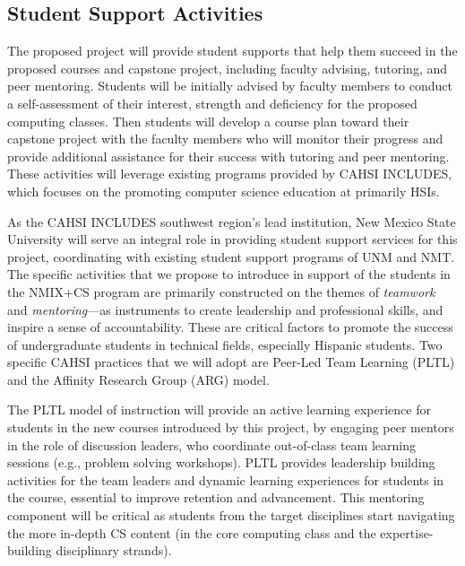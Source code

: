 \subsection{Student Support Activities}
\label{sec:framework:support}

The proposed project will provide student supports that help them succeed in the proposed courses and capstone project, including faculty advising, tutoring, and peer mentoring. Students will be initially advised by faculty members to conduct a self-assessment of their interest, strength and deficiency for the proposed computing classes. Then students will develop a course plan toward their capstone project with the faculty members who will monitor their progress and provide additional assistance for their success with tutoring and peer mentoring. These activities will leverage existing programs provided by CAHSI INCLUDES, which focuses on the promoting computer science education at primarily HSIs.


As the CAHSI INCLUDES southwest region’s lead institution, New Mexico State University will serve an integral role in providing student support services for this project, coordinating with existing student support programs of UNM and NMT. 
The specific activities that we propose to introduce in  support of the students in the NMIX+CS program are primarily constructed on the themes of 
 \emph{teamwork} and \emph{mentoring}---as instruments to create leadership and professional
skills, and inspire a sense of accountability. These are critical factors to promote the success of
undergraduate students in technical fields, especially Hispanic students. Two specific CAHSI practices that we will adopt are Peer-Led Team Learning (PLTL) and the Affinity Research Group (ARG) model. 

The PLTL model of instruction will provide an active learning experience for students in the new courses introduced by this project, by engaging peer mentors
in the role of discussion leaders, who coordinate out-of-class team learning sessions (e.g., problem
solving workshops). PLTL provides leadership building activities for the team leaders and dynamic learning experiences for students in the course, essential to improve retention and advancement. This mentoring component will be critical as students from the target disciplines start navigating the more in-depth CS content (in the core computing class and the expertise-building disciplinary strands). 

